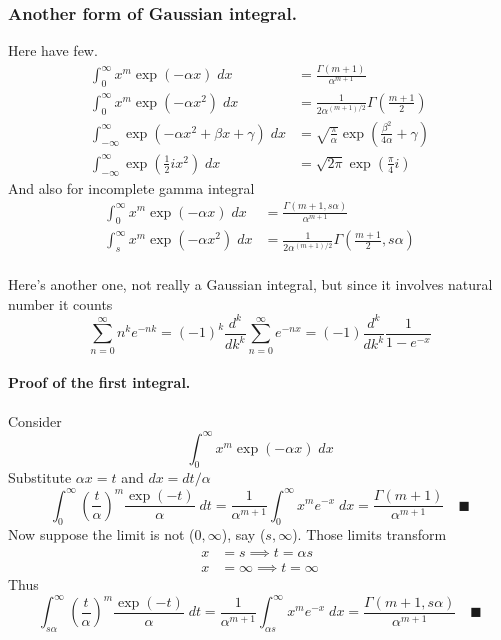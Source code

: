 \documentclass[../../main.tex]{subfiles}
\begin{document}
\subsubsection*{Another form of Gaussian integral.} Here have few.
\begin{align*}
    \int_{0}^{\infty} x^m\exp (-\alpha x)\;dx &= \frac{\Gamma (m+1)}{\alpha^{m+1}}\\
    \int_{0}^{\infty}x^m \exp\left(-\alpha x^2\right)\; dx&=\frac{1}{2\alpha^{(m+1)/2} }\Gamma\left(\frac{m+1}{2}\right)\\
    \int_{-\infty}^{\infty}\exp \left( -\alpha x^2+\beta x+\gamma\right)\;dx&= \sqrt{\frac{\pi}{\alpha}} \exp \left(\frac{\beta^2}{4\alpha}+\gamma\right)\\
    \int_{-\infty}^{\infty}\exp \left(\frac{1}{2}ix^2\right)\;dx& = \sqrt{2\pi}\exp \left(\frac{\pi}{4}i\right) 
\end{align*}
And also for incomplete gamma integral
\begin{align*}
    \int_{0}^{\infty} x^m\exp (-\alpha x)\;dx &= \frac{\Gamma (m+1,s\alpha)}{\alpha^{m+1}}\\
    \int_{s}^{\infty}x^m \exp\left(-\alpha x^2\right)\; dx&=\frac{1}{2\alpha^{(m+1)/2} }\Gamma\left(\frac{m+1}{2},s\alpha\right)\\
\end{align*}

Here's another one, not really a Gaussian integral, but since it involves natural number it counts
\begin{equation*}
    \sum_{n=0}^{\infty}n^ke^{-nk}=(-1)^k\frac{d^k}{dk^k}\sum_{n=0}^{\infty}e^{-nx}=(-1)\frac{d^k}{dk^k}\frac{1}{1-e^{-x}}
\end{equation*}

\paragraph{Proof of the first integral.} Consider
\begin{equation*}
    \int_{0}^{\infty} x^m\exp (-\alpha x)\;dx
\end{equation*}
Substitute $\alpha x=t$ and $dx=dt/\alpha$
\begin{equation*}
    \int_{0}^{\infty} \left(\frac{t}{\alpha}\right)^m \frac{\exp(-t)}{\alpha}\;dt=\frac{1}{\alpha^{m+1}}\int_{0}^{\infty} x^{m}e^{-  x}\;dx=\frac{\Gamma (m+1)}{\alpha^{m+1}}\quad\blacksquare
\end{equation*}
Now suppose the limit is not ($0,\infty$), say  ($s,\infty$). Those limits transform
\begin{align*}
    x&=s\implies t=\alpha s\\
    x&=\infty\implies t=\infty
\end{align*}
Thus
\begin{equation*}
    \int_{s\alpha }^{\infty} \left(\frac{t}{\alpha}\right)^m \frac{\exp(-t)}{\alpha}\;dt=\frac{1}{\alpha^{m+1}}\int_{\alpha s}^{\infty} x^{m}e^{-  x}\;dx=\frac{\Gamma (m+1, s\alpha )}{\alpha^{m+1}}\quad\blacksquare
\end{equation*}
\end{document}
